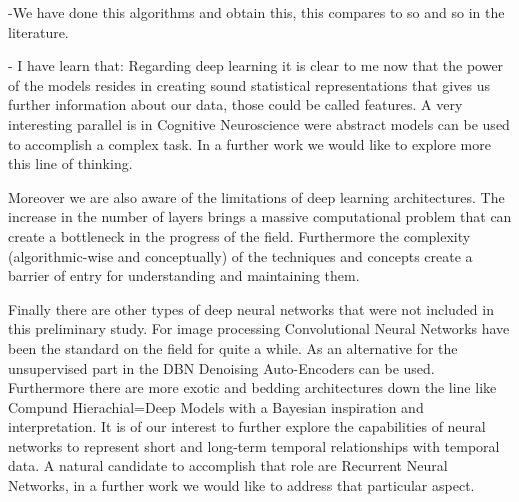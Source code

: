 \documentclass[11pt,a4paper]{article}
\begin{document}
-We have done this algorithms and obtain this, this compares to so and so in the literature.

- I have learn that: 
Regarding deep learning it is clear to me now that the power of the models resides in creating sound statistical representations that gives us further information about our data, those could be called features. A very interesting parallel is in Cognitive Neuroscience were abstract models can be used to accomplish a complex task. In a further work we would like to explore more this line of thinking. 

Moreover we are also aware of the limitations of deep learning architectures. The increase in the number of layers brings a massive computational problem that can create a bottleneck in the progress of the field. Furthermore the complexity (algorithmic-wise and conceptually) of the techniques and concepts create a barrier of entry for understanding and maintaining them.

Finally there are other types of deep neural networks that were not included in this preliminary study.  For image processing Convolutional Neural Networks have been the standard on the field for quite a while. As an alternative for the unsupervised part in the DBN Denoising Auto-Encoders can be used. Furthermore there are more exotic and bedding architectures down the line like Compund Hierachial=Deep Models with a Bayesian inspiration and interpretation. It is of our interest to further explore the capabilities of neural networks to represent short and long-term temporal relationships with temporal data. A natural candidate to accomplish that role are Recurrent Neural Networks, in a further work we would like to address that particular aspect.



\end{document}
